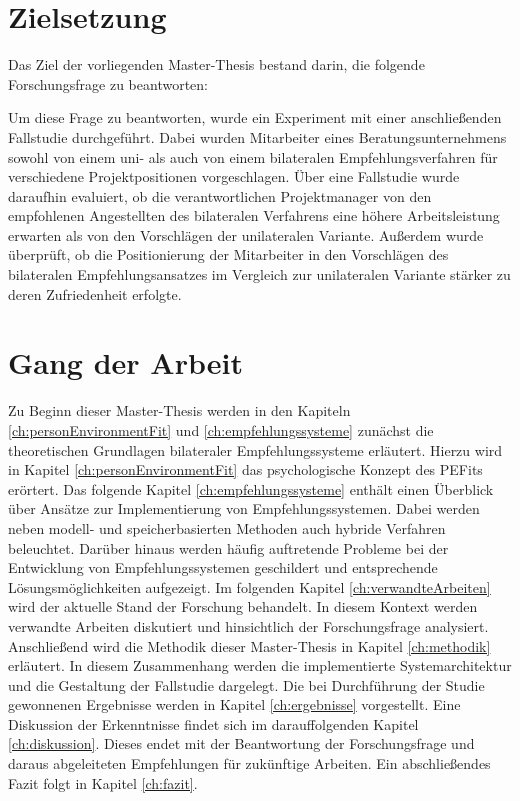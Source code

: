 \newpage
\section{Zielsetzung}
\label{sec:intro:zielsetzung}
Das Ziel der vorliegenden Master-Thesis bestand darin, die folgende Forschungsfrage zu beantworten:

\forschungsfrage

Um diese Frage zu beantworten, wurde ein Experiment mit einer anschließenden Fallstudie durchgeführt. Dabei wurden Mitarbeiter eines Beratungsunternehmens sowohl von einem uni- als auch von einem bilateralen Empfehlungsverfahren für verschiedene Projektpositionen vorgeschlagen. Über eine Fallstudie wurde daraufhin evaluiert, ob die verantwortlichen Projektmanager von den empfohlenen Angestellten des bilateralen Verfahrens eine höhere Arbeitsleistung erwarten als von den Vorschlägen der unilateralen Variante. Außerdem wurde überprüft, ob die Positionierung der Mitarbeiter in den Vorschlägen des bilateralen Empfehlungsansatzes im Vergleich zur unilateralen Variante stärker zu deren Zufriedenheit erfolgte.

\section{Gang der Arbeit}
\label{sec:intro:gangDerArbeit}
Zu Beginn dieser Master-Thesis werden in den Kapiteln \ref{ch:personEnvironmentFit} und \ref{ch:empfehlungssysteme} zunächst die theoretischen Grundlagen bilateraler Empfehlungssysteme erläutert. Hierzu wird in Kapitel \ref{ch:personEnvironmentFit} das psychologische Konzept des \acp{PEFit} erörtert. Das folgende Kapitel \ref{ch:empfehlungssysteme} enthält einen Überblick über Ansätze zur Implementierung von Empfehlungssystemen. Dabei werden neben modell- und speicherbasierten Methoden auch hybride Verfahren beleuchtet. Darüber hinaus werden häufig auftretende Probleme bei der Entwicklung von Empfehlungssystemen geschildert und entsprechende Lösungsmöglichkeiten aufgezeigt. Im folgenden Kapitel \ref{ch:verwandteArbeiten} wird der aktuelle Stand der Forschung behandelt. In diesem Kontext werden verwandte Arbeiten diskutiert und hinsichtlich der Forschungsfrage analysiert. Anschließend wird die Methodik dieser Master-Thesis in Kapitel \ref{ch:methodik} erläutert. In diesem Zusammenhang werden die implementierte Systemarchitektur und die Gestaltung der Fallstudie dargelegt. Die bei Durchführung der Studie gewonnenen Ergebnisse werden in Kapitel \ref{ch:ergebnisse} vorgestellt. Eine Diskussion der Erkenntnisse findet sich im darauffolgenden Kapitel \ref{ch:diskussion}. Dieses endet mit der Beantwortung der Forschungsfrage und daraus abgeleiteten Empfehlungen für zukünftige Arbeiten. Ein abschließendes Fazit folgt in Kapitel \ref{ch:fazit}.
